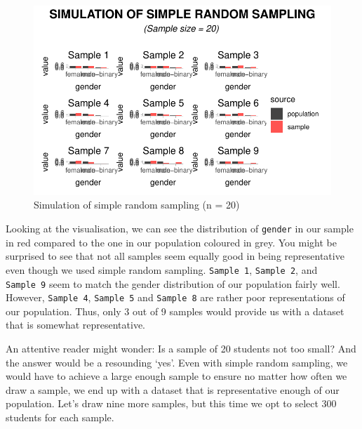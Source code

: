 \documentclass[
  letterpaper,
]{krantz}
\begin{document}
\begin{figure}[H]

{\centering \includegraphics{09_sources_of_bias_files/figure-pdf/drawing-samples-of-20-1.pdf}

}

\caption{Simulation of simple random sampling (n = 20)}

\end{figure}%

Looking at the visualisation, we can see the distribution of
\texttt{gender} in our sample in red compared to the one in our
population coloured in grey. You might be surprised to see that not all
samples seem equally good in being representative even though we used
simple random sampling. \texttt{Sample\ 1}, \texttt{Sample\ 2}, and
\texttt{Sample\ 9} seem to match the gender distribution of our
population fairly well. However, \texttt{Sample\ 4}, \texttt{Sample\ 5}
and \texttt{Sample\ 8} are rather poor representations of our
population. Thus, only 3 out of 9 samples would provide us with a
dataset that is somewhat representative.

An attentive reader might wonder: Is a sample of 20 students not too
small? And the answer would be a resounding `yes'. Even with simple
random sampling, we would have to achieve a large enough sample to
ensure no matter how often we draw a sample, we end up with a dataset
that is representative enough of our population. Let's draw nine more
samples, but this time we opt to select 300 students for each sample.
\end{document}
